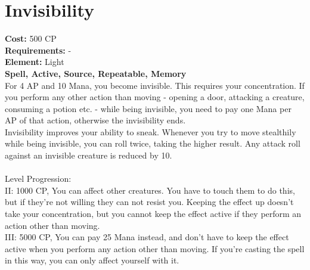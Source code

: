 \section{Invisibility}
\textbf{Cost:} 500 CP\\
\textbf{Requirements:} -\\
\textbf{Element:} Light\\
\textbf{Spell, Active, Source, Repeatable, Memory}\\
For 4 AP and 10 Mana, you become invisible. This requires your concentration. If you perform any other action than moving - opening a door, attacking a creature, consuming a potion etc. - while being invisible, you need to pay one Mana per AP of that action, otherwise the invisibility ends.\\
Invisibility improves your ability to sneak. Whenever you try to move stealthily while being invisible, you can roll twice, taking the higher result. Any attack roll against an invisible creature is reduced by 10.\\
\\
Level Progression:\\
II: 1000 CP, You can affect other creatures. You have to touch them to do this, but if they're not willing they can not resist you. Keeping the effect up doesn't take your concentration, but you cannot keep the effect active if they perform an action other than moving.\\
III: 5000 CP, You can pay 25 Mana instead, and don't have to keep the effect active when you perform any action other than moving. If you're casting the spell in this way, you can only affect yourself with it.\\